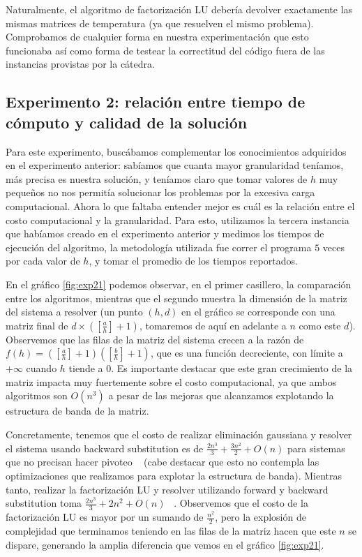 Naturalmente, el algoritmo de factorización LU debería devolver exactamente las mismas matrices de temperatura (ya que resuelven el mismo problema). Comprobamos de cualquier forma en nuestra experimentación que esto funcionaba así como forma de testear la correctitud del código fuera de las instancias provistas por la cátedra.

\subsection{Experimento 2: relación entre tiempo de cómputo y calidad de la solución}

Para este experimento, buscábamos complementar los conocimientos adquiridos en el experimento anterior: sabíamos que cuanta mayor granularidad teníamos, más precisa es nuestra solución, y teníamos claro que tomar valores de $h$ muy pequeños no nos permitía solucionar los problemas por la excesiva carga computacional. Ahora lo que faltaba entender mejor es cuál es la relación entre el costo computacional y la granularidad. Para esto, utilizamos la tercera instancia que habíamos creado en el experimento anterior y medimos los tiempos de ejecución del algoritmo, la metodología utilizada fue correr el programa $5$ veces por cada valor de $h$, y tomar el promedio de los tiempos reportados.

En el gráfico \ref{fig:exp21} podemos observar, en el primer casillero, la comparación entre los algoritmos, mientras que el segundo muestra la dimensión de la matriz del sistema a resolver (un punto $(h, d)$ en el gráfico se corresponde con una matriz final de $d \times ([\frac{a}{h}] + 1)$, tomaremos de aquí en adelante a $n$ como este $d$). Observemos que las filas de la matriz del sistema crecen a la razón de $f(h) = ([\frac{a}{h}] + 1)([\frac{b}{h}] + 1)$, que es una función decreciente, con límite a $+\infty$ cuando $h$ tiende a $0$. Es importante destacar que este gran crecimiento de la matriz impacta muy fuertemente sobre el costo computacional, ya que ambos algoritmos son $O(n^3)$ a pesar de las mejoras que alcanzamos explotando la estructura de banda de la matriz.

Concretamente, tenemos que el costo de realizar eliminación gaussiana y resolver el sistema usando backward substitution es de $\frac{2n^3}{3} + \frac{3n^2}{2} + O(n)$ para sistemas que no precisan hacer pivoteo ~\cite{burden} (cabe destacar que esto no contempla las optimizaciones que realizamos para explotar la estructura de banda). Mientras tanto, realizar la factorización LU y resolver utilizando forward y backward substitution toma $\frac{2n^3}{3} + 2n^2 + O(n)$ ~\cite{LUComplexity}. Observemos que el costo de la factorización LU es mayor por un sumando de $\frac{n^2}{2}$, pero la explosión de complejidad que terminamos teniendo en las filas de la matriz hacen que este $n$ se dispare, generando la amplia diferencia que vemos en el gráfico \ref{fig:exp21}.

